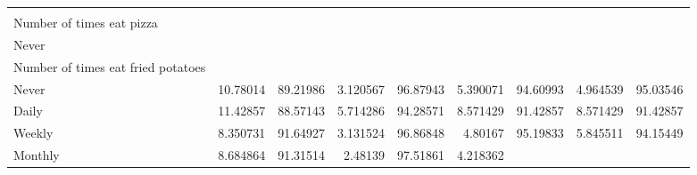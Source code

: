 \documentclass{article}
\begin{document}
\begin{table}[!h]
{\begin{tabular}{lllllllll}
				\multicolumn{1}{r}{} \\
				\multicolumn{1}{l}{\hspace{2em}Number of times eat pizza} &
				\multicolumn{1}{|r}{} &
				\multicolumn{1}{r}{} &
				\multicolumn{1}{r}{} &
				\multicolumn{1}{r}{} &
				\multicolumn{1}{r}{} &
				\multicolumn{1}{r}{} &
				\multicolumn{1}{r}{} &
				\multicolumn{1}{r}{} \\
				\multicolumn{1}{l}{\hspace{3em}Never} &
				\multicolumn{1}{|r}{} &
				\multicolumn{1}{r}{} &
				\multicolumn{1}{r}{} &
				\multicolumn{1}{r}{} &
				\multicolumn{1}{r}{} &
				\multicolumn{1}{r}{} &
				\multicolumn{1}{r}{} &
				\multicolumn{1}{r}{} \\
				\multicolumn{1}{l}{\hspace{4em}Number of times eat fried potatoes} &
				\multicolumn{1}{|r}{} &
				\multicolumn{1}{r}{} &
				\multicolumn{1}{r}{} &
				\multicolumn{1}{r}{} &
				\multicolumn{1}{r}{} &
				\multicolumn{1}{r}{} &
				\multicolumn{1}{r}{} &
				\multicolumn{1}{r}{} \\
				\multicolumn{1}{l}{\hspace{5em}Never} &
				\multicolumn{1}{|r}{10.78014} &
				\multicolumn{1}{r}{89.21986} &
				\multicolumn{1}{r}{3.120567} &
				\multicolumn{1}{r}{96.87943} &
				\multicolumn{1}{r}{5.390071} &
				\multicolumn{1}{r}{94.60993} &
				\multicolumn{1}{r}{4.964539} &
				\multicolumn{1}{r}{95.03546} \\
				\multicolumn{1}{l}{\hspace{5em}Daily} &
				\multicolumn{1}{|r}{11.42857} &
				\multicolumn{1}{r}{88.57143} &
				\multicolumn{1}{r}{5.714286} &
				\multicolumn{1}{r}{94.28571} &
				\multicolumn{1}{r}{8.571429} &
				\multicolumn{1}{r}{91.42857} &
				\multicolumn{1}{r}{8.571429} &
				\multicolumn{1}{r}{91.42857} \\
				\multicolumn{1}{l}{\hspace{5em}Weekly} &
				\multicolumn{1}{|r}{8.350731} &
				\multicolumn{1}{r}{91.64927} &
				\multicolumn{1}{r}{3.131524} &
				\multicolumn{1}{r}{96.86848} &
				\multicolumn{1}{r}{4.80167} &
				\multicolumn{1}{r}{95.19833} &
				\multicolumn{1}{r}{5.845511} &
				\multicolumn{1}{r}{94.15449} \\
				\multicolumn{1}{l}{\hspace{5em}Monthly} &
				\multicolumn{1}{|r}{8.684864} &
				\multicolumn{1}{r}{91.31514} &
				\multicolumn{1}{r}{2.48139} &
				\multicolumn{1}{r}{97.51861} &
				\multicolumn{1}{r}{4.218362} &

\end{tabular}}
\end{table}
\end{document}
